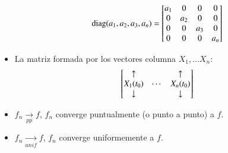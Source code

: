 \begin{multicols}{2}
\begin{itemize}
            $$ \diag(a_1, a_2, a_3, a_n) =
                \mx{
                    a_1 & 0  & 0  & 0  \\
                     0  &a_2 & 0  & 0  \\
                     0  & 0  & a_3& 0  \\
                     0  & 0  & 0  & a_n
                }
            $$
        \item La matriz formada por los vectores columna $X_1, \ldots X_n$:
        $$
        \mx{\uparrow && \uparrow\\ X_1(t_0) & \cdots & X_n(t_0) \\ \downarrow && \downarrow}
        $$
        \item $f_n \xrightarrow[pp]{} f$, $f_n$ converge puntualmente (o punto a punto) a $f$.
        \item $f_n \xrightarrow[unif]{} f$, $f_n$ converge uniformemente a $f$.
    \end{itemize}
\end{multicols}
